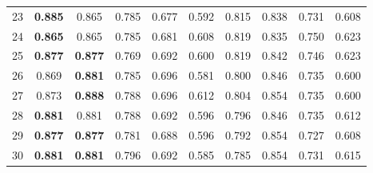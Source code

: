 \begin{table}[]
\begin{tabular}{|c|ccccccccc|}
23   & \textbf{0.885}                   & 0.865                        & 0.785                              & 0.677                             & 0.592                    & 0.815                             & 0.838                             & 0.731                            & 0.608                       \\ \cline{1-1}
24   & \textbf{0.865}                   & 0.865                        & 0.785                              & 0.681                             & 0.608                    & 0.819                             & 0.835                             & 0.750                            & 0.623                       \\ \hline
25   & \textbf{0.877}                   & \textbf{0.877}               & 0.769                              & 0.692                             & 0.600                    & 0.819                             & 0.842                             & 0.746                            & 0.623                       \\ \cline{1-1}
26   & 0.869                            & \textbf{0.881}               & 0.785                              & 0.696                             & 0.581                    & 0.800                             & 0.846                             & 0.735                            & 0.600                       \\ \cline{1-1}
27   & 0.873                            & \textbf{0.888}               & 0.788                              & 0.696                             & 0.612                    & 0.804                             & 0.854                             & 0.735                            & 0.600                       \\ \cline{1-1}
28   & \textbf{0.881}                   & 0.881                        & 0.788                              & 0.692                             & 0.596                    & 0.796                             & 0.846                             & 0.735                            & 0.612                       \\ \cline{1-1}
29   & \textbf{0.877}                   & \textbf{0.877}               & 0.781                              & 0.688                             & 0.596                    & 0.792                             & 0.854                             & 0.727                            & 0.608                       \\ \cline{1-1}
30   & \textbf{0.881}                   & \textbf{0.881}               & 0.796                              & 0.692                             & 0.585                    & 0.785                             & 0.854                             & 0.731                            & 0.615                       \\ \hline

\end{tabular}
\end{table}
